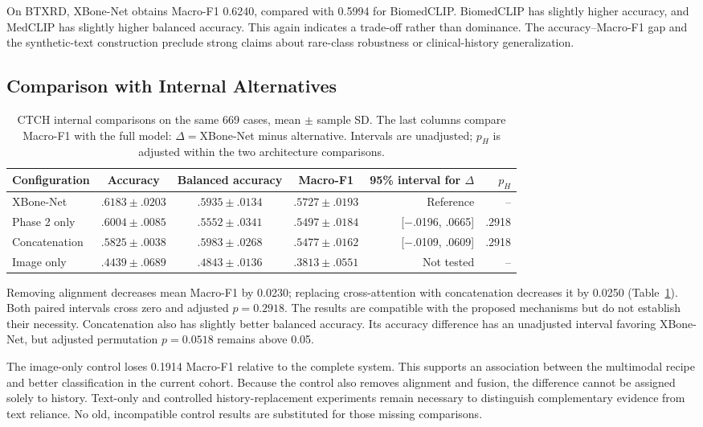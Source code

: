 \documentclass[conference,a4paper]{IEEEtran}
\begin{document}
On BTXRD, XBone-Net obtains Macro-F1 0.6240, compared with 0.5994 for BiomedCLIP. BiomedCLIP has slightly higher accuracy, and MedCLIP has slightly higher balanced accuracy. This again indicates a trade-off rather than dominance. The accuracy--Macro-F1 gap and the synthetic-text construction preclude strong claims about rare-class robustness or clinical-history generalization.

\subsection{Comparison with Internal Alternatives}
\begin{table}[t]
\caption{CTCH internal comparisons on the same 669 cases, mean $\pm$ sample SD. The last columns compare Macro-F1 with the full model: $\Delta=$XBone-Net minus alternative. Intervals are unadjusted; $p_H$ is adjusted within the two architecture comparisons.}
\label{tab:ablation}
\centering\small
\begin{tabular}{@{}lcccrr@{}}
\toprule
Configuration & Accuracy & Balanced accuracy & Macro-F1 & 95\% interval for $\Delta$ & $p_H$ \\
\midrule
XBone-Net & $.6183\pm.0203$ & $.5935\pm.0134$ & $.5727\pm.0193$ & Reference & -- \\
Phase 2 only & $.6004\pm.0085$ & $.5552\pm.0341$ & $.5497\pm.0184$ & [$-$.0196, .0665] & .2918 \\
Concatenation & $.5825\pm.0038$ & $.5983\pm.0268$ & $.5477\pm.0162$ & [$-$.0109, .0609] & .2918 \\
Image only & $.4439\pm.0689$ & $.4843\pm.0136$ & $.3813\pm.0551$ & Not tested & -- \\
\bottomrule
\end{tabular}
\end{table}

Removing alignment decreases mean Macro-F1 by 0.0230; replacing cross-attention with concatenation decreases it by 0.0250 (Table~\ref{tab:ablation}). Both paired intervals cross zero and adjusted $p=0.2918$. The results are compatible with the proposed mechanisms but do not establish their necessity. Concatenation also has slightly better balanced accuracy. Its accuracy difference has an unadjusted interval favoring XBone-Net, but adjusted permutation $p=0.0518$ remains above 0.05.

The image-only control loses 0.1914 Macro-F1 relative to the complete system. This supports an association between the multimodal recipe and better classification in the current cohort. Because the control also removes alignment and fusion, the difference cannot be assigned solely to history. Text-only and controlled history-replacement experiments remain necessary to distinguish complementary evidence from text reliance. No old, incompatible control results are substituted for those missing comparisons.
\end{document}
